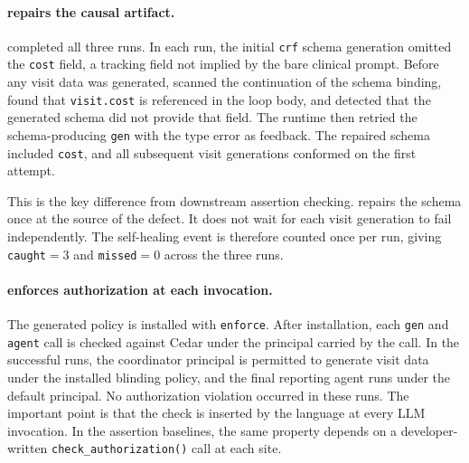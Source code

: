 \paragraph{\pact{} repairs the causal artifact.}
\pact{} completed all three runs. In each run, the initial
\texttt{crf} schema generation omitted the \texttt{cost} field, a
tracking field not implied by the bare clinical prompt. Before any visit
data was generated, \pact{} scanned the continuation of the schema
binding, found that \texttt{visit.cost} is referenced in the loop body,
and detected that the generated schema did not provide that field. The
runtime then retried the schema-producing \texttt{gen} with the type
error as feedback. The repaired schema included \texttt{cost}, and all
subsequent visit generations conformed on the first attempt.

This is the key difference from downstream assertion checking. \pact{}
repairs the schema once at the source of the defect. It does not wait
for each visit generation to fail independently. The self-healing event
is therefore counted once per run, giving \texttt{caught}$=3$ and
\texttt{missed}$=0$ across the three runs.

\paragraph{\pact{} enforces authorization at each invocation.}
The generated policy is installed with \texttt{enforce}. After
installation, each \texttt{gen} and \texttt{agent} call is checked
against Cedar under the principal carried by the call. In the successful
\pact{} runs, the coordinator principal is permitted to generate visit
data under the installed blinding policy, and the final reporting
agent runs under the default principal. No authorization violation
occurred in these runs. The
important point is that the check is inserted by the language at every
LLM invocation. In the assertion baselines, the same property depends on
a developer-written \texttt{check\_authorization()} call at each site.

